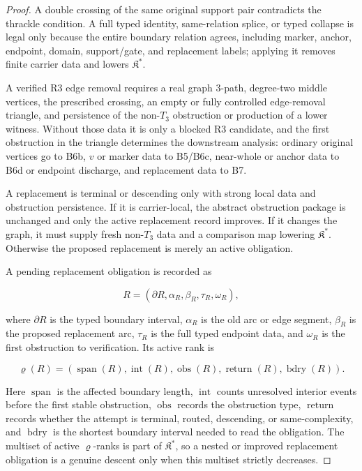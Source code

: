 \documentclass[11pt]{amsart}
\theoremstyle{definition}
\begin{document}
\begin{proof}
A double crossing of the same original support pair contradicts the thrackle condition. A full typed identity, same-relation splice, or typed collapse is legal only because the entire boundary relation agrees, including marker, anchor, endpoint, domain, support/gate, and replacement labels; applying it removes finite carrier data and lowers \(\mathfrak K^\ast\).

A verified R3 edge removal requires a real graph \(3\)-path, degree-two middle
vertices, the prescribed crossing, an empty or fully controlled edge-removal
triangle, and persistence of the non-\(T_3\) obstruction or production of a lower
witness. Without those data it is only a blocked R3 candidate, and the first
obstruction in the triangle determines the downstream analysis: ordinary
original vertices go to B6b, \(v\) or marker data to B5/B6c, near-whole or anchor
data to B6d or endpoint discharge, and replacement data to B7.

A replacement is terminal or descending only with strong local data and
obstruction persistence. If it is carrier-local, the abstract obstruction
package is unchanged and only the active replacement record improves. If it
changes the graph, it must supply fresh non-\(T_3\) data and a comparison map
lowering \(\mathfrak K^\ast\). Otherwise the proposed replacement is merely an
active obligation.

A pending replacement obligation is recorded as

\[
R=(\partial R,\alpha_R,\beta_R,\tau_R,\omega_R),
\]

where \(\partial R\) is the typed boundary interval, \(\alpha_R\) is the old arc or
edge segment, \(\beta_R\) is the proposed replacement arc, \(\tau_R\) is the full
typed endpoint data, and \(\omega_R\) is the first obstruction to verification.
Its active rank is

\[
\varrho(R)=
(\operatorname{span}(R),\operatorname{int}(R),\operatorname{obs}(R),
\operatorname{return}(R),\operatorname{bdry}(R)).
\]

Here \(\operatorname{span}\) is the affected boundary length, \(\operatorname{int}\) counts unresolved interior events before the first stable obstruction, \(\operatorname{obs}\) records the obstruction type, \(\operatorname{return}\) records whether the attempt is terminal, routed, descending, or same-complexity, and \(\operatorname{bdry}\) is the shortest boundary interval needed to read the obligation. The multiset of active \(\varrho\)-ranks is part of \(\mathfrak K^\ast\), so a nested or improved replacement obligation is a genuine descent only when this multiset strictly decreases.

\end{proof}
\end{document}
